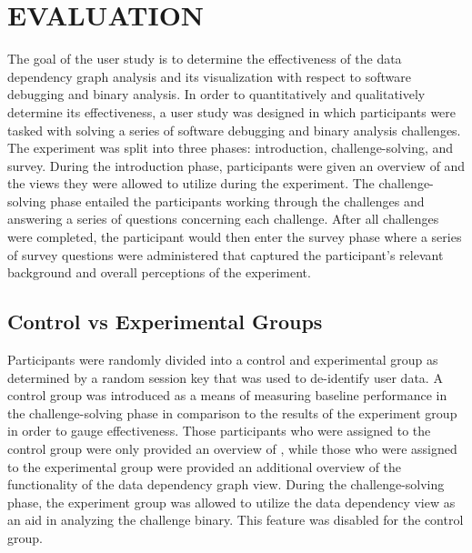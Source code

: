 \chapter{EVALUATION}
The goal of the user study is to determine the effectiveness of the data dependency graph analysis and its  visualization with respect to software debugging and binary analysis. In order to quantitatively and qualitatively determine its effectiveness, a user study was designed in which participants were tasked with solving a series of software debugging and binary analysis challenges. The experiment was split into three phases: introduction, challenge-solving, and survey. During the introduction phase, participants were given an overview of  and the views they were allowed to utilize during the experiment. The challenge-solving phase entailed the participants working through the challenges and answering a series of questions concerning each challenge. After all challenges were completed, the participant would then enter the survey phase where a series of survey questions were administered that captured the participant’s relevant background and overall perceptions of the experiment.

\section{Control vs Experimental Groups}
Participants were randomly divided into a control and experimental group as determined by a random session key that was used to de-identify user data. A control group was introduced as a means of measuring baseline performance in the challenge-solving phase in comparison to the results of the experiment group in order to gauge effectiveness. Those participants who were assigned to the control group were only provided an overview of , while those who were assigned to the experimental group were provided an additional overview of the functionality of the data dependency graph view. During the challenge-solving phase, the experiment group was allowed to utilize the data dependency view as an aid in analyzing the challenge binary. This feature was disabled for the control group.

